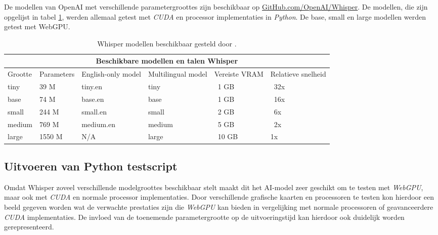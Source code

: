 \bigbreak{}

De modellen van OpenAI met verschillende parametergroottes zijn beschikbaar op \href{https://github.com/openai/whisper}{GitHub.com/OpenAI/Whisper}. De modellen, die zijn opgelijst in tabel \ref{tab:OpenAIWhisperModels}, werden allemaal getest met \textit{CUDA} en processor implementaties in \textit{Python}. De base, small en large modellen werden getest met WebGPU.

\begin{table}[b]
    \begin{tabular}{ |p{1.6cm}|p{2.5cm}|p{2.7cm}|p{2.7cm}|p{1.9cm}|p{1.8cm}|  }
        \hline
        \multicolumn{6}{|c|}{Beschikbare modellen en talen Whisper} \\
        \hline
            Grootte& Parameters & English-only model & Multilingual model & Vereiste VRAM & Relatieve snelheid\\
        \hline
            tiny&       39 M    &tiny.en    & tiny& ~1 GB& ~32x     \\
            base &      74 M	&base.en    & base & ~1 GB & ~16x   \\
            small &     244 M	&small.en   & small & ~2 GB & ~6x   \\
            medium &    769 M	&medium.en  & medium & ~5 GB & ~2x  \\
            large &     1550 M	&N/A        & large & ~10 GB& 	1x  \\
        \hline
    \end{tabular}
    \caption{Whisper modellen beschikbaar gesteld door \textcite{OpenAI2023}.}
    \label{tab:OpenAIWhisperModels}
\end{table}

\break{}

\subsection{Uitvoeren van Python testscript}

Omdat Whisper zoveel verschillende modelgroottes beschikbaar stelt maakt dit het AI-model zeer geschikt om te testen met \textit{WebGPU}, maar ook met \textit{CUDA} en normale processor implementaties. Door verschillende grafische kaarten en processoren te testen kon hierdoor een beeld gegeven worden wat de verwachte prestaties zijn die \textit{WebGPU} kan bieden in vergelijking met normale processoren of geavanceerdere \textit{CUDA} implementaties. De invloed van de toenemende parametergrootte op de uitvoeringstijd kan hierdoor ook duidelijk worden gerepresenteerd.

